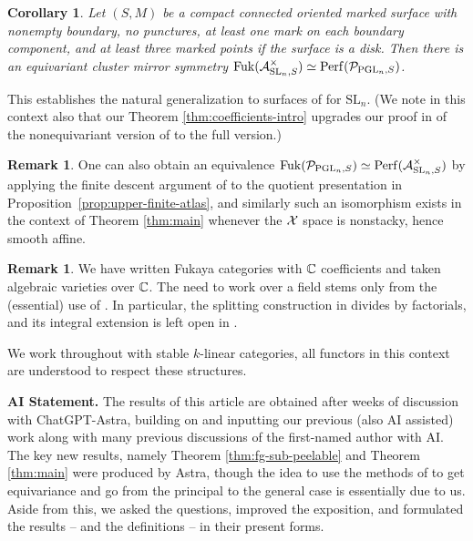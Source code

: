 \documentclass[12pt, letter]{amsart}
\newtheorem{corollary}[theorem]{Corollary}
\theoremstyle{definition}
\newtheorem{remark}[theorem]{Remark}
\newcommand{\Ac}{\mathcal A}
\newcommand{\PP}{\mathcal P}
\numberwithin{equation}{section}
\begin{document}
\begin{corollary}\label{cor:FG}
Let $(S,M)$ be a compact connected oriented marked surface with
nonempty boundary, no punctures, at least one mark on each boundary
component, and at least three marked points if the surface is a disk.
Then there is an equivariant cluster mirror symmetry $\Fuk(\Ac^\times_{\mathrm{SL}_n,S})
       \simeq\Perf(\PP_{\mathrm{PGL}_n,S})$. 
\end{corollary}
This establishes the natural generalization to surfaces of \cite[Conjecture 1.5]{Goncharov-Shen} for $\mathrm{SL}_n$.  
(We note in this context also that our Theorem \ref{thm:coefficients-intro} upgrades our proof in \cite{HS} of the nonequivariant version of \cite[Conjecture 1.5]{Goncharov-Shen} to the full version.) 

\begin{remark}
    One can also obtain an equivalence
$\Fuk(\PP_{\mathrm{PGL}_n,S})
 \simeq\Perf(\Ac^\times_{\mathrm{SL}_n,S})$ by applying the finite descent argument
of \cite[Section~5.5]{HS} to the quotient presentation in
Proposition~\ref{prop:upper-finite-atlas}, and similarly such an isomorphism exists in the context of Theorem \ref{thm:main} whenever the $\mathcal{X}$ space is nonstacky, hence smooth affine. 
\end{remark}


\begin{remark}
    We have written Fukaya categories with $\mathbb C$ coefficients and taken algebraic varieties over $\mathbb C$.  The need to work over a field stems only from the (essential) use of \cite{Pom}.   In particular, the splitting construction in
\cite[Section~4.3]{Pom} divides by factorials, and its integral extension
is left open in \cite[Remark~4.23]{Pom}.
\end{remark}

We work throughout with stable $k$-linear categories, all functors in this context are understood to respect these structures.

{\bf AI Statement.} 
The results of this article are obtained after weeks of discussion with ChatGPT-Astra, building on and inputting our previous (also AI assisted) work \cite{HSinv, HS} along with many previous discussions of the first-named author with AI. 
The key new results, namely Theorem \ref{thm:fg-sub-peelable} and Theorem \ref{thm:main} were produced by Astra, though the idea to use the methods of \cite{ShendeToric}  to get equivariance and go from the principal to  the general case is essentially due to us.  Aside from this, we asked the questions,  improved the exposition, and formulated the results -- and  the definitions -- in their present forms.   
\end{document}
